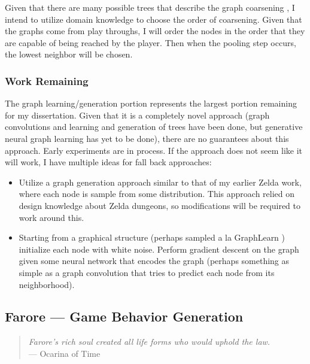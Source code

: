 \documentclass[a4paper]{article}
\begin{document}
Given that there are many possible trees that describe the graph coarsening \cite{Comparisonofcoarseningschemesformultilevelgraphpartitioning}, I intend to utilize domain knowledge to choose the order of coarsening.  Given that the graphs come from play throughs, I will order the nodes in the order that they are capable of being reached by the player.  Then when the pooling step occurs, the lowest neighbor will be chosen.


\subsubsection{Work Remaining}

The graph learning/generation portion represents the largest portion remaining for my dissertation.  Given that it is a completely novel approach (graph convolutions \cite{kipfgraphconvolutions}  and learning and generation of trees \cite{trees} have been done, but generative neural graph learning has yet to be done), there are no guarantees about this approach.  Early experiments are in process.  If the approach does not seem like it will work, I have multiple ideas for fall back approaches:

\begin{itemize}
\item Utilize a graph generation approach similar to that of my earlier Zelda work, where each node is sample from some distribution. This approach relied on design knowledge about Zelda dungeons, so modifications will be required to work around this.
\item Starting from a graphical structure (perhaps sampled a la GraphLearn \cite{Learning an efficient constructive sampler for graphs.}) initialize each node with white noise.  Perform gradient descent on the graph given some neural network that encodes the graph (perhaps something as simple as a graph convolution that tries to predict each node from its neighborhood).
\end{itemize}



\subsection{Farore --- Game Behavior Generation}
\begin{quotation}
\textit{Farore's rich soul created all life forms who would uphold the law.}  \\ \indent \indent --- Ocarina of Time
\end{quotation}



\end{document}
